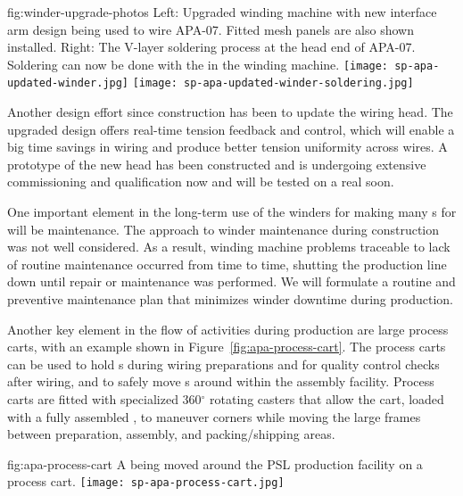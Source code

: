 \begin{dunefigure}{fig:winder-upgrade-photos}
{Left: Upgraded winding machine with new interface arm design being used to wire APA-07. Fitted mesh panels are also shown installed. Right: The V-layer soldering process at the head end of APA-07. Soldering can now be done with the  in the winding machine.}
\texttt{[image: sp-apa-updated-winder.jpg]} 
\texttt{[image: sp-apa-updated-winder-soldering.jpg]}
\end{dunefigure}

Another design effort since  construction has been to update the wiring head. The upgraded design offers real-time tension feedback and control, which will enable a big time savings in wiring and produce better tension uniformity across wires.  A prototype of the new head has been constructed and is undergoing extensive commissioning and qualification now and will be tested on a real  soon.     

One important element in the long-term use of the winders for making many s for  will be maintenance.  The approach to winder maintenance during  construction was not well considered. As a result, winding machine problems traceable to lack of routine maintenance occurred from time to time, shutting the production line down until repair or maintenance was performed. We will formulate a routine and preventive maintenance plan that minimizes winder downtime during  production.

Another key element in the flow of activities during production are large process carts, with an example shown in Figure~\ref{fig:apa-process-cart}. The process carts can be used to hold s during wiring preparations and for quality control checks after wiring, and to safely move s around within the assembly facility. Process carts are fitted with specialized 360$^\circ$ rotating casters that allow the cart, loaded with a fully assembled , to maneuver corners while moving the large frames between preparation, assembly, and packing/shipping areas.

\begin{dunefigure}{fig:apa-process-cart}
{A   being moved around the PSL production facility on a process cart.}
\texttt{[image: sp-apa-process-cart.jpg]}
\end{dunefigure}


